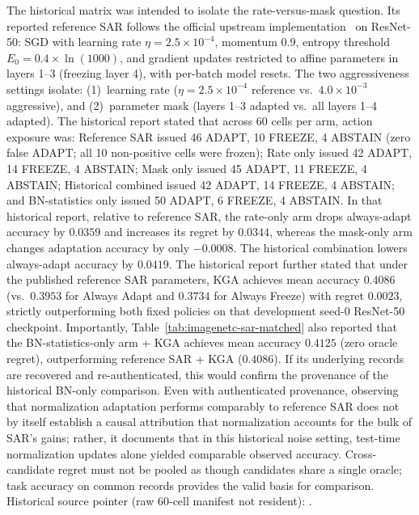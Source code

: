 The historical matrix was intended to isolate the rate-versus-mask question. Its reported reference SAR follows the official upstream implementation~\cite{niu2023sar}
on ResNet-50: SGD with learning rate $\eta = 2.5\times10^{-4}$, momentum $0.9$, entropy threshold $E_0 = 0.4 \times \ln(1000)$,
and gradient updates restricted to affine parameters in layers 1--3 (freezing layer 4), with per-batch model resets.
The two aggressiveness settings isolate: (1)~learning rate ($\eta = 2.5\times 10^{-4}$ reference vs.\ $4.0\times 10^{-3}$ aggressive),
and (2)~parameter mask (layers 1--3 adapted vs.\ all layers 1--4 adapted).
The historical report stated that across 60 cells per arm, action exposure was: Reference SAR issued 46 ADAPT, 10 FREEZE, 4 ABSTAIN (zero false ADAPT; all 10 non-positive cells were frozen);
Rate only issued 42 ADAPT, 14 FREEZE, 4 ABSTAIN; Mask only issued 45 ADAPT, 11 FREEZE, 4 ABSTAIN; Historical combined issued 42 ADAPT, 14 FREEZE, 4 ABSTAIN;
and BN-statistics only issued 50 ADAPT, 6 FREEZE, 4 ABSTAIN.
In that historical report, relative to reference SAR, the rate-only arm drops always-adapt accuracy by $0.0359$ and increases its regret by
$0.0344$, whereas the mask-only arm changes adaptation accuracy by only $-0.0008$. The historical combination
lowers always-adapt accuracy by $0.0419$. The historical report further stated that under the published reference SAR parameters,
KGA achieves mean accuracy $0.4086$ (vs.\ $0.3953$ for Always Adapt and $0.3734$ for Always Freeze) with
regret $0.0023$, strictly outperforming both fixed policies on that development seed-0 ResNet-50 checkpoint.
Importantly, Table~\ref{tab:imagenetc-sar-matched} also reported that the BN-statistics-only arm + KGA achieves
mean accuracy $0.4125$ (zero oracle regret), outperforming reference SAR + KGA ($0.4086$).
If its underlying records are recovered and re-authenticated, this would confirm the provenance of the historical BN-only comparison. Even with authenticated provenance, observing that normalization adaptation performs comparably to reference SAR does not by itself establish a causal attribution that normalization accounts for the bulk of SAR's gains; rather, it documents that in this historical noise setting, test-time normalization updates alone yielded comparable observed accuracy. Cross-candidate regret must not be pooled as though candidates
share a single oracle; task accuracy on common records provides the valid basis for comparison.
Historical source pointer (raw 60-cell manifest not resident): .

